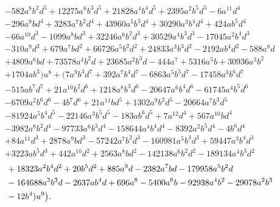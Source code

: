 \documentclass[microtype]{gtpart}     %
\theoremstyle{remark}
\theoremstyle{definition}
\begin{document}
\begin{equation*}
\begin{split}
      & - 582 a^8 b^2 d^5 + 12275 a^6 b^3 d^5 + 21828 a^4 b^4 d^5 + 2395 a^2 b^5 d^5 - 6 a^{11} d^4 \\
      & - 296 a^9 b d^4 + 3283 a^7 b^2 d^4 + 43960 a^5 b^3 d^4 + 30290 a^3 b^4 d^4 + 424 a b^5 d^4 \\
      & - 66 a^{10} d^3 - 1099 a^8 b d^3 + 32246 a^6 b^2 d^3 + 30529 a^4 b^3 d^3 - 17045 a^2 b^4 d^3 \\
      & - 310 a^9 d^2 + 679 a^7 b d^2 + 66726 a^5 b^2 d^2 + 24833 a^3 b^3 d^2 - 2192 a b^4 d^2 - 588 a^8 d \\
      & + 4809 a^6 b d + 73578 a^4 b^2 d + 23685 a^2 b^3 d - 444 a^7 + 5316 a^5 b + 30936 a^3 b^2 \\
      & + 1704 a b^3) u^8 + (7 a^9 b^3 d^7 + 392 a^7 b^4 d^7 - 6863 a^5 b^5 d^7 - 17458 a^3 b^6 d^7 \\
      & - 515 a b^7 d^7 + 21 a^{10} b^2 d^6 + 1218 a^8 b^3 d^6 - 20647 a^6 b^4 d^6 - 61745 a^4 b^5 d^6 \\
      & - 6709 a^2 b^6 d^6 - 4 b^7 d^6 + 21 a^{11} b d^5 + 1302 a^9 b^2 d^5 - 20664 a^7 b^3 d^5 \\
      & - 81924 a^5 b^4 d^5 - 22146 a^3 b^5 d^5 - 183 a b^6 d^5 + 7 a^{12} d^4 + 567 a^{10} b d^4 \\
      & - 3982 a^8 b^2 d^4 - 97733 a^6 b^3 d^4 - 158644 a^4 b^4 d^4 - 8392 a^2 b^5 d^4 - 4 b^6 d^4 \\
      & + 84 a^{11} d^3 + 2878 a^9 b d^3 - 57242 a^7 b^2 d^3 - 160981 a^5 b^3 d^3 + 59447 a^3 b^4 d^3 \\
      & + 3223 a b^5 d^3 + 442 a^{10} d^2 + 2563 a^8 b d^2 - 142138 a^6 b^2 d^2 - 189134 a^4 b^3 d^2 
\end{split}
\end{equation*}
\begin{equation*}
\begin{split}
\qua  & + 18323 a^2 b^4 d^2 + 20 b^5 d^2 + 885 a^9 d - 2382 a^7 b d - 179958 a^5 b^2 d \\
      & - 164688 a^3 b^3 d - 2637 a b^4 d + 696 a^8 - 5400 a^6 b - 92938 a^4 b^2 - 29078 a^2 b^3 \\
      & - 12 b^4) u^9 \big).  
\end{split}
\end{equation*}

%
%
%

%



\end{document}
